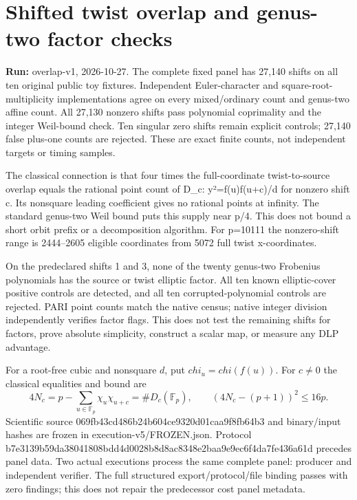 \documentclass[10pt]{article}
\begin{document}
\section*{Shifted twist overlap and genus-two factor checks}
\textbf{Run:} overlap-v1, 2026-10-27.
The complete fixed panel has 27,140 shifts on all ten original public toy fixtures. Independent Euler-character and square-root-multiplicity implementations agree on every mixed/ordinary count and genus-two affine count. All 27,130 nonzero shifts pass polynomial coprimality and the integer Weil-bound check. Ten singular zero shifts remain explicit controls; 27,140 false plus-one counts are rejected. These are exact finite counts, not independent targets or timing samples.

The classical connection is that four times the full-coordinate twist-to-source overlap equals the rational point count of D\_c: y²=f(u)f(u+c)/d for nonzero shift c. Its nonsquare leading coefficient gives no rational points at infinity. The standard genus-two Weil bound puts this supply near p/4. This does not bound a short orbit prefix or a decomposition algorithm. For p=10111 the nonzero-shift range is 2444–2605 eligible coordinates from 5072 full twist x-coordinates.

On the predeclared shifts 1 and 3, none of the twenty genus-two Frobenius polynomials has the source or twist elliptic factor. All ten known elliptic-cover positive controls are detected, and all ten corrupted-polynomial controls are rejected. PARI point counts match the native census; native integer division independently verifies factor flags. This does not test the remaining shifts for factors, prove absolute simplicity, construct a scalar map, or measure any DLP advantage.

For a root-free cubic and nonsquare $d$, put $chi_u=chi(f(u))$.
For $c\ne0$ the classical equalities and bound are
\[
4N_c=p-\sum_{u\in\mathbb F_p}\chi_u\chi_{u+c}=\#D_c(\mathbb F_p),
\qquad (4N_c-(p+1))^2\le16p.
\]
Scientific source 069fb43c\allowbreak{}d486b24b\allowbreak{}604ce932\allowbreak{}0d01caa9\allowbreak{}f8fb64b3 and binary/input hashes are frozen in execution-v5/FROZEN.json. Protocol b7e3139b\allowbreak{}59da3804\allowbreak{}1808bdd4\allowbreak{}d0028b8d\allowbreak{}8ac8348e\allowbreak{}2baa9e9e\allowbreak{}c6f4da7f\allowbreak{}e436a61d precedes panel data. Two actual executions process the same complete panel: producer and independent verifier. The full structured export/protocol/file binding passes with zero findings; this does not repair the predecessor cost panel metadata.
\end{document}
